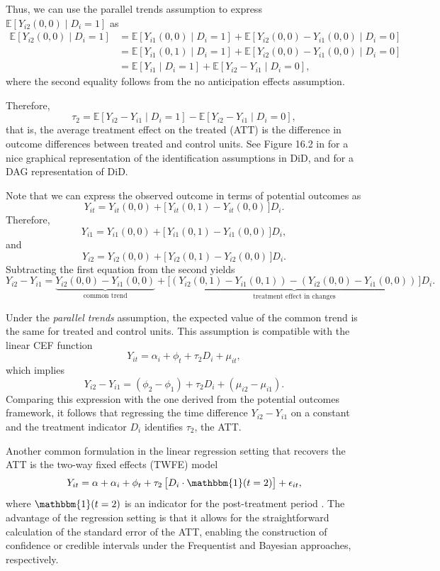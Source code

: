 Thus, we can use the parallel trends assumption to express \( \mathbb{E}[Y_{i2}(0,0) \mid D_i = 1] \) as
\begin{align*}
	\mathbb{E}[Y_{i2}(0,0)\mid D_i = 1] 
	&= \mathbb{E}[Y_{i1}(0,0) \mid D_i = 1] + \mathbb{E}[Y_{i2}(0,0) - Y_{i1}(0,0) \mid D_i = 0] \\
	&= \mathbb{E}[Y_{i1}(0,1) \mid D_i = 1] + \mathbb{E}[Y_{i2}(0,0) - Y_{i1}(0,0) \mid D_i = 0] \\
	&= \mathbb{E}[Y_{i1} \mid D_i = 1] + \mathbb{E}[Y_{i2} - Y_{i1} \mid D_i = 0],
\end{align*}
where the second equality follows from the no anticipation effects assumption.

Therefore,
\[
\tau_2 = \mathbb{E}[Y_{i2} - Y_{i1} \mid D_i = 1] - \mathbb{E}[Y_{i2} - Y_{i1} \mid D_i = 0],
\]
that is, the average treatment effect on the treated (ATT) is the difference in outcome differences between treated and control units. See Figure 16.2 in \cite{chernozhukov2024applied} for a nice graphical representation of the identification assumptions in DiD, and \cite{normington2022bayesian} for a DAG representation of DiD.

Note that we can express the observed outcome in terms of potential outcomes as
\[
Y_{it} = Y_{it}(0,0) + \big[\,Y_{it}(0,1) - Y_{it}(0,0)\,\big] D_i.
\]
Therefore,
\[
Y_{i1} = Y_{i1}(0,0) + \big[\,Y_{i1}(0,1) - Y_{i1}(0,0)\,\big] D_i,
\]
and
\[
Y_{i2} = Y_{i2}(0,0) + \big[\,Y_{i2}(0,1) - Y_{i2}(0,0)\,\big] D_i.
\]
Subtracting the first equation from the second yields
\[
Y_{i2} - Y_{i1} = \underbrace{Y_{i2}(0,0) - Y_{i1}(0,0)}_{\text{common trend}} 
+ \underbrace{\big[(Y_{i2}(0,1) - Y_{i1}(0,1)) - (Y_{i2}(0,0) - Y_{i1}(0,0))\,\big]}_{\text{treatment effect in changes}} D_i.
\]

Under the \emph{parallel trends} assumption, the expected value of the common trend is the same for treated and control units. This assumption is compatible with the linear CEF function
\[
Y_{it} = \alpha_i + \phi_t + \tau_2 D_i + \mu_{it},
\]
which implies
\[
Y_{i2} - Y_{i1} = (\phi_2 - \phi_1) + \tau_2 D_i + (\mu_{i2} - \mu_{i1}).
\]
Comparing this expression with the one derived from the potential outcomes framework, it follows that regressing the time difference $Y_{i2} - Y_{i1}$ on a constant and the treatment indicator $D_i$ identifies $\tau_2$, the ATT.

Another common formulation in the linear regression setting that recovers the ATT is the two-way fixed effects (TWFE) model
\[
Y_{it} = \alpha + \alpha_i + \phi_t + \tau_2 \,\big[ D_i \cdot \mathbbm{1}(t = 2) \big] + \epsilon_{it},
\]
where $\mathbbm{1}(t = 2)$ is an indicator for the post-treatment period \cite{roth2023whats}. The advantage of the regression setting is that it allows for the straightforward calculation of the standard error of the ATT, enabling the construction of confidence or credible intervals under the Frequentist and Bayesian approaches, respectively.\\

